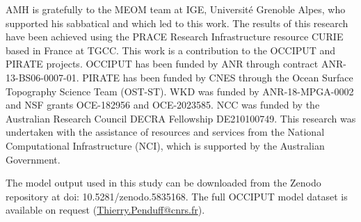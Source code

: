 \documentclass[linenumbers]{agujournal2019}
\begin{document}
\acknowledgments
AMH is gratefully to the MEOM team at IGE, Universit{\'e} Grenoble Alpes, who supported his sabbatical and which led to this work. 
The results of this research have been achieved using the PRACE Research Infrastructure resource CURIE based in France at TGCC. 
This work is a contribution to the OCCIPUT and PIRATE projects. 
OCCIPUT has been funded by ANR through contract ANR-13-BS06-0007-01. 
PIRATE has been funded by CNES through the Ocean Surface Topography Science Team (OST-ST). 
WKD was funded by ANR-18-MPGA-0002 and NSF grants OCE-182956 and OCE-2023585.
NCC was funded by the Australian Research Council DECRA Fellowship DE210100749.
This research was undertaken with the assistance of resources and services from the National Computational Infrastructure (NCI), which is supported by the Australian Government.

The model output used in this study can be downloaded from the Zenodo repository at doi: 10.5281/zenodo.5835168.
The full OCCIPUT model dataset is available on request (\href{mailto:Thierry.Penduff@cnrs.fr}{Thierry.Penduff@cnrs.fr}).


\end{document}

